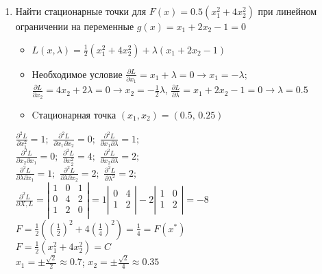 \documentclass[preprint,russian,a5paper,10pt,twoside]{ncc}
\begin{document}
\begin{enumerate}[resume]
\item Найти стационарные точки для $F\left( x \right)=0.5\left( x_{1}^{2}+4x_{2}^{2} \right)$ при линейном ограничении на переменные $g\left( x \right)={{x}_{1}}+2{{x}_{2}}-1=0$ 
\begin{itemize}
\item $L\left( x,\lambda  \right)=\frac{1}{2}\left( x_{1}^{2}+4x_{2}^{2} \right)+\lambda \left( {{x}_{1}}+2{{x}_{2}}-1 \right)$
\item Необходимое условие $\frac{\partial L}{\partial {{x}_{1}}}={{x}_{1}}+\lambda =0\to {{x}_{1}}=-\lambda ;$ $\frac{\partial L}{\partial {{x}_{2}}}=4{{x}_{2}}+2\lambda =0\to {{x}_{2}}=-\frac{1}{2}\lambda $, $\frac{\partial L}{\partial \lambda }={{x}_{1}}+2{{x}_{2}}-1=0\to \lambda =0.5$
\item Cтационарная точка $\left( {{x}_{1}},{{x}_{2}} \right)=\left( 0.5,\,0.25 \right)$
\end{itemize}


$\frac{{{\partial }^{2}}L}{\partial x_{1}^{2}}=1;$ $\frac{{{\partial }^{2}}L}{\partial {{x}_{1}}\partial {{x}_{2}}}=0;$ $\frac{{{\partial }^{2}}L}{\partial {{x}_{1}}\partial \lambda }=1;$ 
\\$\frac{{{\partial }^{2}}L}{\partial {{x}_{2}}\partial {{x}_{1}}}=0;$ $\frac{{{\partial }^{2}}L}{\partial x_{2}^{2}}=4;$ $\frac{{{\partial }^{2}}L}{\partial {{x}_{2}}\partial \lambda }=2;$
\\$\frac{{{\partial }^{2}}L}{\partial \lambda \partial {{x}_{1}}}=1;$ $\frac{{{\partial }^{2}}L}{\partial \lambda \partial {{x}_{2}}}=2;$ $\frac{{{\partial }^{2}}L}{\partial {{\lambda }^{2}}}=2;$
\\$\frac{{{\partial }^{2}}L}{\partial X,L}=\left| \begin{matrix}
   1 & 0 & 1  \\
   0 & 4 & 2  \\
   1 & 2 & 0  \\
\end{matrix} \right|=1\left| \begin{matrix}
   0 & 4  \\
   1 & 2  \\
\end{matrix} \right|-2\left| \begin{matrix}
   1 & 0  \\
   1 & 2  \\
\end{matrix} \right|=-8$
\\$F=\frac{1}{2}\left( {{\left( \frac{1}{2} \right)}^{2}}+4{{\left( \frac{1}{4} \right)}^{2}} \right)=\frac{1}{4}=F\left( {{x}^{*}} \right)$
\\$F=\frac{1}{2}\left( x_{1}^{2}+4x_{2}^{2} \right)=C$ 
\\${{x}_{1}}=\pm \frac{\sqrt{2}}{2}\approx 0.7$; ${{x}_{2}}=\pm \frac{\sqrt{2}}{4}\approx 0.35$
\end{enumerate}
\end{document}
